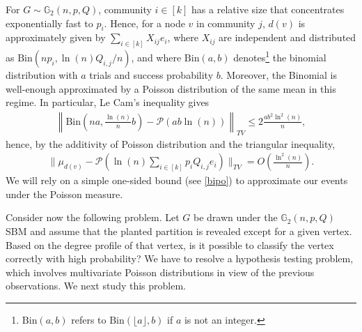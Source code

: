 \documentclass[11pt]{article}
\newcommand{\gs}{\mathbb{G}_2}
\newcommand{\bin}{\mathrm{Bin}}
\newcommand{\1}{\mathbb{1}}
\begin{document}
For $G \sim \gs(n,p,Q)$, community $i \in [k]$ has a relative size that concentrates exponentially fast to $p_i$. Hence, for a node $v$ in community $j$, $d(v)$ is approximately given by $\sum_{i \in [k]} X_{ij}e_i$, 
where $X_{ij}$ are independent and distributed as $\bin(np_i,\ln(n)Q_{i,j}/n)$, and where $\bin(a,b)$ denotes\footnote{$\bin(a,b)$ refers to $\bin( \lfloor a \rfloor,b)$ if $a$ is not an integer.} the binomial distribution with $a$ trials and success probability $b$. Moreover, the Binomial is well-enough approximated by a Poisson distribution of the same mean in this regime. In particular, Le Cam's inequality gives 
\begin{align}
\left\| \bin \left(n a, \frac{\ln(n)}{n} b \right) -  \mathcal{P}\left(a b  \ln(n) \right) \right\|_{TV} \leq 2 \frac{a b^2 \ln^2(n)}{n},
\end{align}
hence, by the additivity of Poisson distribution and the triangular inequality, 
\begin{align}
\| \mu_{d(v)} -  \mathcal{P}(\ln(n) \sum_{i \in [k]} p_i Q_{i,j}e_i) \|_{TV} = O \left(\frac{\ln^2(n)}{n} \right).
\end{align} 
We will rely on a simple one-sided bound (see \eqref{bipo}) to approximate our events under the Poisson measure. 

Consider now the following problem. Let $G$ be drawn under the $\gs(n,p,Q)$ SBM and assume that the planted partition is revealed except for a given vertex. Based on the degree profile of that vertex, is it possible to classify the vertex correctly with high probability? We have to resolve a hypothesis testing problem, which involves multivariate Poisson distributions in view of the previous observations. We next study this problem.\\ 
\end{document}
